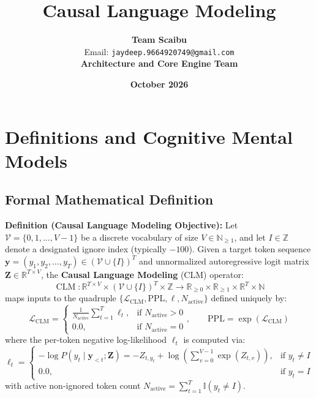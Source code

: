 \documentclass[11pt,a4paper]{article}
\title{\textbf{Causal Language Modeling}}
\author{\textbf{Team Scaibu} \\ \small Email: \texttt{jaydeep.9664920749@gmail.com} \\ \small \textbf{Architecture and Core Engine Team}}
\date{\textbf{October 2026}}
\theoremstyle{definition}
\begin{document}
\maketitle

\section{Definitions and Cognitive Mental Models}

\subsection{Formal Mathematical Definition}
\textbf{Definition (Causal Language Modeling Objective):}
Let $\mathcal{V} = \{0, 1, \dots, V-1\}$ be a discrete vocabulary of size $V \in \mathbb{N}_{\ge 1}$, and let $I \in \mathbb{Z}$ denote a designated ignore index (typically $-100$). Given a target token sequence $\mathbf{y} = (y_1, y_2, \dots, y_T) \in (\mathcal{V} \cup \{I\})^T$ and unnormalized autoregressive logit matrix $\mathbf{Z} \in \mathbb{R}^{T \times V}$, the \textbf{Causal Language Modeling} (CLM) operator:
{\boldmath
\begin{equation}
\operatorname{CLM}: \mathbb{R}^{T \times V} \times (\mathcal{V} \cup \{I\})^T \times \mathbb{Z} \longrightarrow \mathbb{R}_{\ge 0} \times \mathbb{R}_{\ge 1} \times \mathbb{R}^T \times \mathbb{N}
\end{equation}
}
maps inputs to the quadruple $\{\mathcal{L}_{\text{CLM}}, \text{PPL}, \boldsymbol{\ell}, N_{\text{active}}\}$ defined uniquely by:
{\boldmath
\begin{equation}
\mathcal{L}_{\text{CLM}} = \begin{cases} \frac{1}{N_{\text{active}}} \sum_{t=1}^T \ell_t, & \text{if } N_{\text{active}} > 0 \\ 0.0, & \text{if } N_{\text{active}} = 0 \end{cases}, \qquad \text{PPL} = \exp(\mathcal{L}_{\text{CLM}})
\end{equation}
}
where the per-token negative log-likelihood $\ell_t$ is computed via:
{\boldmath
\begin{equation}
\ell_t = \begin{cases} -\log P(y_t \mid \mathbf{y}_{<t}; \mathbf{Z}) = -Z_{t, y_t} + \log\left(\sum_{v=0}^{V-1} \exp(Z_{t, v})\right), & \text{if } y_t \ne I \\ 0.0, & \text{if } y_t = I \end{cases}
\end{equation}
}
with active non-ignored token count $N_{\text{active}} = \sum_{t=1}^T \mathbb{I}(y_t \ne I)$.
\end{document}
